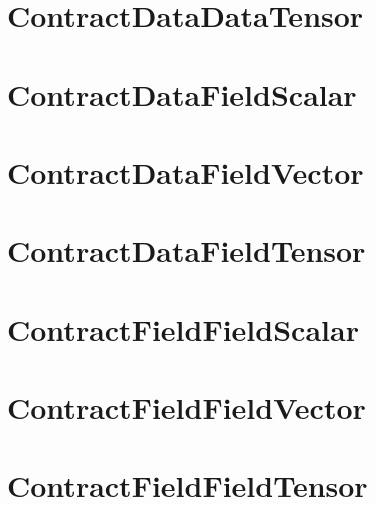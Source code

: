 \section{ContractDataDataTensor}



\section{ContractDataFieldScalar}

\section{ContractDataFieldVector}

\section{ContractDataFieldTensor}



\section{ContractFieldFieldScalar}

\section{ContractFieldFieldVector}

\section{ContractFieldFieldTensor}

